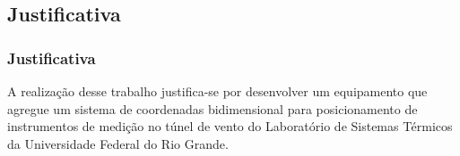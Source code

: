 \subsection{Justificativa}

\begin{frame}
\frametitle{Justificativa}

A realização desse trabalho justifica-se por desenvolver um equipamento que agregue um sistema de coordenadas bidimensional para posicionamento de instrumentos de medição no túnel de vento do Laboratório de Sistemas Térmicos  da Universidade Federal do Rio Grande.

\end{frame}
